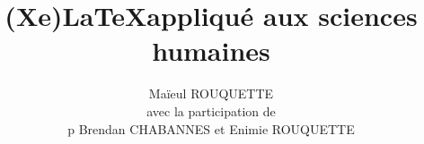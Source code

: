 \documentclass[twoside,10pt]{book}
\begin{document}
\title{(Xe)\LaTeX appliqué aux sciences humaines}
\author{Maïeul ROUQUETTE \\ avec la participation de \\p Brendan CHABANNES et Enimie ROUQUETTE}
\date{}


\end{document}
